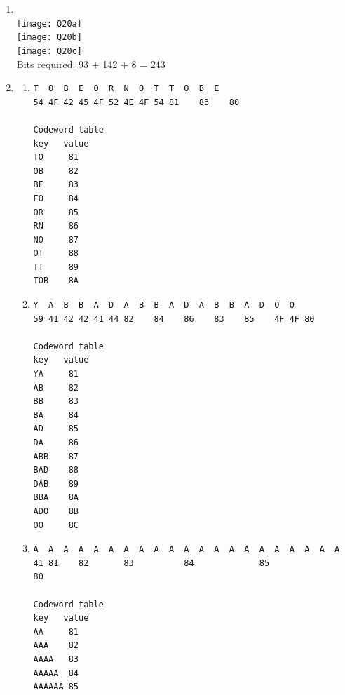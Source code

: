 \documentclass[11pt,fleqn]{article}
\begin{document}
\begin{enumerate}
	\item  $~$\\
\texttt{[image: Q20a]} \\
\texttt{[image: Q20b]} \\
\texttt{[image: Q20c]} \\
Bits required: 93 + 142 + 8 = 243

	\item 
\begin{enumerate}
\item \begin{Verbatim}
T  O  B  E  O  R  N  O  T  T  O  B  E
54 4F 42 45 4F 52 4E 4F 54 81    83    80

Codeword table
key   value
TO     81
OB     82
BE     83
EO     84
OR     85
RN     86
NO     87
OT     88
TT     89
TOB    8A
\end{Verbatim}

\item \begin{Verbatim}
Y  A  B  B  A  D  A  B  B  A  D  A  B  B  A  D  O  O
59 41 42 42 41 44 82    84    86    83    85    4F 4F 80

Codeword table
key   value
YA     81
AB     82
BB     83
BA     84
AD     85
DA     86
ABB    87
BAD    88
DAB    89
BBA    8A
ADO    8B
OO     8C
\end{Verbatim}

\item \begin{Verbatim}
A  A  A  A  A  A  A  A  A  A  A  A  A  A  A  A  A  A  A  A  A
41 81    82       83          84             85                80

Codeword table
key   value
AA     81
AAA    82
AAAA   83
AAAAA  84
AAAAAA 85
\end{Verbatim}
\end{enumerate}

\end{enumerate}
\end{document}
